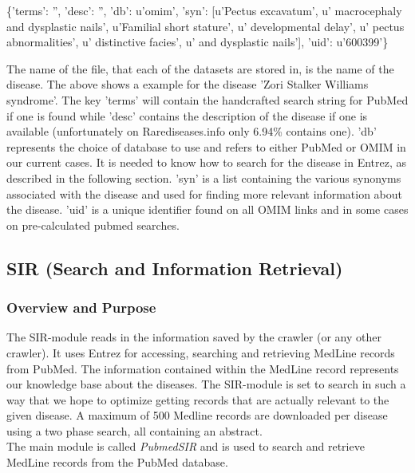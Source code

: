\begin{center}
{\small
\{'terms': '', 'desc': '', 'db': u'omim', 'syn': [u'Pectus excavatum', u' macrocephaly and dysplastic nails', u'Familial short stature', u' developmental delay', u' pectus abnormalities', u' distinctive facies', u' and dysplastic nails'], 'uid': u'600399'\} 
}
\end{center}

The name of the file, that each of the datasets are stored in, is the
name of the disease. The above shows a example for the disease 'Zori
Stalker Williams syndrome'. The key 'terms' will contain the
handcrafted search string for PubMed if one is found while 'desc'
contains the description of the disease if one is available
(unfortunately on Rarediseases.info only 6.94\% contains one). 'db'
represents the choice of database to use and refers to either PubMed
or OMIM in our current cases. It is needed to know how to search for
the disease in Entrez, as described in the following section. 'syn' is
a list containing the various synonyms associated with the disease and
used for finding more relevant information about the disease. 'uid' is
a unique identifier found on all OMIM links and in some cases on
pre-calculated pubmed searches.

\subsection{SIR (Search and Information Retrieval)\label{SIR}}

\subsubsection{Overview and Purpose}
The SIR-module reads in the information saved by the crawler (or any
other crawler). It uses Entrez for accessing, searching and retrieving
MedLine records from PubMed. The information contained within the
MedLine record represents our knowledge base about the diseases. The
SIR-module is set to search in such a way that we hope to optimize
getting records that are actually relevant to the given disease. A
maximum of 500 Medline records are downloaded per disease using a two
phase search, all containing an abstract. \\

The main module is called \textit{PubmedSIR} and is used to search and
retrieve MedLine records from the PubMed database.\\

